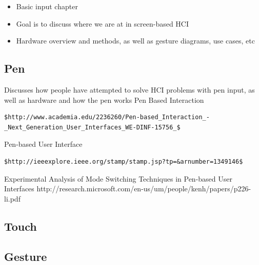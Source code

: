 \documentclass[12pt]{article}
\begin{document}
\begin{itemize}
\item Basic input chapter
\item Goal is to discuss where we are at in screen-based HCI
\item Hardware overview and methods, as well as gesture diagrams, use cases, etc
\end{itemize}
\subsection{Pen}

Discusses how people have attempted to solve HCI problems with pen input, as well as hardware and how the pen works 
Pen Based Interaction 
\begin{verbatim}
$http://www.academia.edu/2236260/Pen-based_Interaction_-_Next_Generation_User_Interfaces_WE-DINF-15756_$
\end{verbatim}
Pen-based User Interface 
\begin{verbatim}
$http://ieeexplore.ieee.org/stamp/stamp.jsp?tp=&arnumber=1349146$
\end{verbatim}
Experimental Analysis of Mode Switching Techniques in Pen-based User Interfaces http://research.microsoft.com/en-us/um/people/kenh/papers/p226-li.pdf
\subsection{Touch}

\subsection{Gesture}
\end{document}
